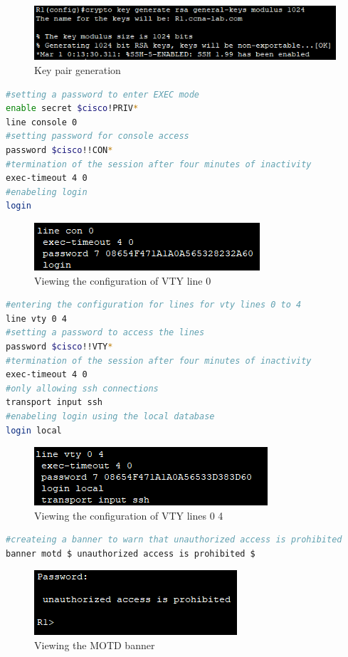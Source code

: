 \documentclass[a4paper]{article}
\newcommand{\abc}{\hfill \break}
\begin{document}
\begin{figure}[h]
	\includegraphics[scale=0.55]{images/keygen.png}
	\centering
	\caption{Key pair generation}
\end{figure}
\begin{lstlisting}[language=bash,
	keywordstyle=\color{black},
	rulecolor=\color{blue}]
#setting a password to enter EXEC mode
enable secret $cisco!PRIV*
line console 0
#setting password for console access
password $cisco!!CON*
#termination of the session after four minutes of inactivity
exec-timeout 4 0
#enabeling login 
login
\end{lstlisting}
\begin{figure}[h]
	\includegraphics[scale=0.55]{images/line con0.png}
	\centering
	\caption{Viewing the configuration of VTY line 0}
\end{figure}
\begin{lstlisting}[language=bash,
	keywordstyle=\color{black},
	rulecolor=\color{blue}]
#entering the configuration for lines for vty lines 0 to 4
line vty 0 4
#setting a password to access the lines
password $cisco!!VTY*
#termination of the session after four minutes of inactivity
exec-timeout 4 0
#only allowing ssh connections
transport input ssh
#enabeling login using the local database
login local
\end{lstlisting}
\begin{figure}[h]
	\includegraphics[scale=0.55]{images/votylines.png}
	\centering
	\caption{Viewing the configuration of VTY lines 0 4}
\end{figure}
\begin{lstlisting}[language=bash,
	keywordstyle=\color{black},
	rulecolor=\color{blue}]
#createing a banner to warn that unauthorized access is prohibited
banner motd $ unauthorized access is prohibited $
\end{lstlisting}
\begin{figure}[h]
	\includegraphics[scale=0.55]{images/banner.png}
	\centering
	\caption{Viewing the MOTD banner}
\end{figure}\abc
\end{document}
